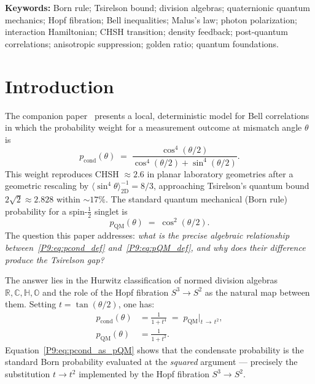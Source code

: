 \documentclass[11pt,a4paper]{article}
\theoremstyle{definition}
\theoremstyle{remark}
\newcommand{\CC}{\mathbb{C}}
\newcommand{\HH}{\mathbb{H}}
\newcommand{\OO}{\mathbb{O}}
\newcommand{\RR}{\mathbb{R}}
\newcommand{\pcond}{p_{\mathrm{cond}}}
\newcommand{\pQM}{p_{\mathrm{QM}}}
\newcommand{\Tsirelson}{2\sqrt{2}}
\begin{document}
\footnotesize
\noindent\textbf{Keywords:} Born rule; Tsirelson bound; division algebras;
quaternionic quantum mechanics; Hopf fibration; Bell inequalities;
Malus's law; photon polarization; interaction Hamiltonian; CHSH transition;
density feedback; post-quantum correlations; anisotropic suppression;
golden ratio; quantum foundations.
\normalsize
 
\tableofcontents
 
\section{Introduction}
\label{P9:sec:intro}
 
The companion paper~\cite{Paper8} presents a local, deterministic model
for Bell correlations in which the probability weight for a measurement
outcome at mismatch angle $\theta$ is
\begin{equation}
  \pcond(\theta)
  \;=\; \frac{\cos^4(\theta/2)}{\cos^4(\theta/2)+\sin^4(\theta/2)}.
  \label{P9:eq:pcond_def}
\end{equation}
This weight reproduces CHSH $\approx2.6$ in planar laboratory geometries after
a geometric rescaling by $\langle\sin^4\theta\rangle_\mathrm{2D}^{-1} = 8/3$,
approaching Tsirelson's quantum bound $\Tsirelson\approx2.828$ within
$\sim17\%$.
The standard quantum mechanical (Born rule) probability for a spin-$\tfrac{1}{2}$
singlet is
\begin{equation}
  \pQM(\theta) \;=\; \cos^2(\theta/2).
  \label{P9:eq:pQM_def}
\end{equation}
The question this paper addresses: \emph{what is the precise algebraic relationship
between~\eqref{P9:eq:pcond_def} and~\eqref{P9:eq:pQM_def}, and why does their
difference produce the Tsirelson gap?}
 
The answer lies in the Hurwitz classification of normed division algebras
$\RR,\CC,\HH,\OO$ and the role of the Hopf fibration $S^3\to S^2$ as the
natural map between them.
Setting $t=\tan(\theta/2)$, one has:
\begin{align}
  \pcond(\theta) &= \frac{1}{1+t^4}
  \;=\; \pQM\bigl|_{t\,\to\, t^2}, \label{P9:eq:pcond_as_pQM}\\
  \pQM(\theta)   &= \frac{1}{1+t^2}. \label{P9:eq:pQM_tan}
\end{align}
Equation~\eqref{P9:eq:pcond_as_pQM} shows that the condensate probability is the
standard Born probability evaluated at the \emph{squared} argument —
precisely the substitution $t\to t^2$ implemented by the Hopf fibration
$S^3\to S^2$.
 
\end{document}
